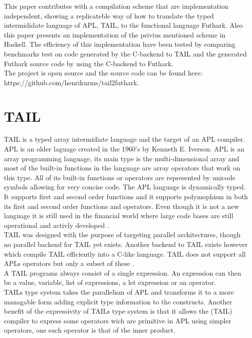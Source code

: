\documentclass[11pt]{article}
\begin{document}
This paper contributes with a compilation scheme that are implementation independent, showing a replicateble 
way of how to translate the typed intermididate language of APL, TAIL, to the functional language Futhark. Also 
this paper presents an implementation of the privius mentioned scheme in Haskell. The efficiency of this
 implementation have been tested by comparing benchmarks test on code generated by the C-backend to TAIL 
 and the generated Futhark source code by using the C-backend to Futhark. \\

The project is open source and the source code can be found here:\\ https://github.com/henrikurms/tail2futhark.

\section{TAIL}

TAIL is a typed array intermidiate language and the target of an APL compiler.
APL is an older laguage created in the 1960's by Kenneth E. Iverson.
APL is an array programming language, its main type is the multi-dimensional array 
and most of the built-in functions in the language are array operators that work on this type. 
All of its built-in functions or operators are represented by unicode symbols allowing for very concise code.
The APL language is dynamically typed. It supports first and second order functions and it supports polymophism in 
both its first and second order functions and operators. 
Even though it is not a new language it is still used in the financial world 
where large code bases are still operational and activly developed \cite{ElsmanDybdal:Array:2014}. \\


TAIL was designed with the purpose of targeting parallel architectures, though no parallel backend for TAIL yet exists.
Another backend to TAIL exists however which compile TAIL efficiently into a C-like language. TAIL does not support
 all APLs operators but only a subset of these \cite{ElsmanDybdal:Array:2014}.\\

A TAIL programs always consist of a single expression. An expression can then be a value, variable, 
list of expressions, a let expression or an operator. \\

TAILs type system takes the parallelism of APL and transforms it to a more managable form adding explicit type
 information to the constructs.
Another benefit of the expressivity of TAILs type system is that it allows the (TAIL) compiler to express some operators wich
are primitive in APL using simpler operators, one such operator is that of the inner product. \\
 
\end{document}
